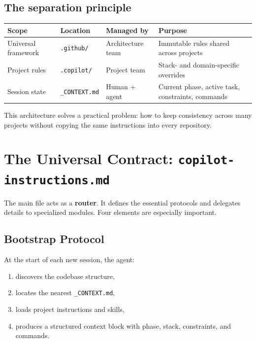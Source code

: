 \subsection{The separation principle}

\begin{center}
\begin{tabularx}{\textwidth}{l l l X}
\toprule
\textbf{Scope} & \textbf{Location} & \textbf{Managed by} & \textbf{Purpose} \\
\midrule
Universal framework & \texttt{.github/} & Architecture team & Immutable rules shared across projects \\
Project rules & \texttt{.copilot/} & Project team & Stack- and domain-specific overrides \\
Session state & \texttt{\_CONTEXT.md} & Human + agent & Current phase, active task, constraints, commands \\
\bottomrule
\end{tabularx}
\end{center}

This architecture solves a practical problem: how to keep consistency across many projects without copying the same instructions into every repository.

\section{The Universal Contract: \texttt{copilot-instructions.md}}

The main file acts as a \textbf{router}. It defines the essential protocols and delegates details to specialized modules. Four elements are especially important.

\subsection{Bootstrap Protocol}
At the start of each new session, the agent:
\begin{enumerate}
  \item discovers the codebase structure,
  \item locates the nearest \texttt{\_CONTEXT.md},
  \item loads project instructions and skills,
  \item produces a structured context block with phase, stack, constraints, and commands.
\end{enumerate}

